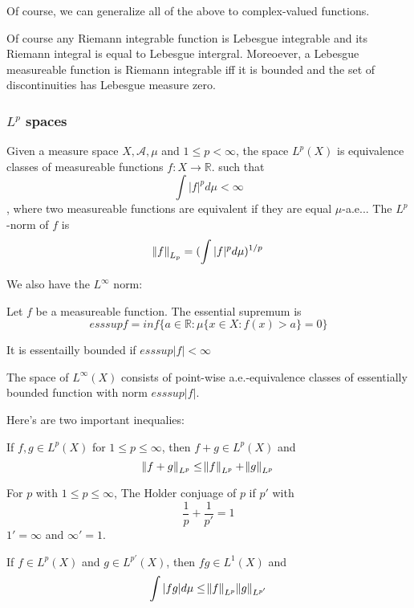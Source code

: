 \documentclass[main.tex]{subfiles}
\begin{document}
Of course, we can generalize all of the above to complex-valued functions.

\begin{theorem}
Of course any Riemann integrable function is Lebesgue integrable and its Riemann integral is equal to Lebesgue intergral. Moreoever, a Lebesgue measureable function is Riemann integrable iff it is bounded and the set of discontinuities has Lebesgue measure zero.
\end{theorem}

\subsubsection{$L^p$ spaces}

\begin{definition}
Given a measure space $X, \mathcal{A}, \mu$ and $1 \leq p < \infty$, the space $L^p(X)$ is equivalence classes of measureable functions $f: X \rightarrow \mathbb{R}$. such that
$$
\int |f|^p d\mu < \infty
$$, 
where two measureable functions are equivalent if they are equal $\mu$-a.e... The $L^p$-norm of $f$ is 
$$
\norm{f}_{L_p} = (\int |f|^p d\mu )^{1/p}
$$

\end{definition}
We also have the $L^\infty$ norm:
\begin{definition}
Let $f$ be a measureable function. The essential supremum is 
$$
ess sup f = inf \{a \in \mathbb{R}: \mu \{x \in X : f(x) > a \} = 0 \}
$$

It is essentailly bounded if $ess sup|f| < \infty$

The space of $L^\infty(X)$ consists of point-wise a.e.-equivalence classes of essentially bounded function with norm $ess sup|f|$.
\end{definition}

Here's are two important inequalies:

\begin{theorem}
If $f, g \in L^p(X)$ for $1 \leq p \leq \infty$, then $f + g \in L^p(X)$ and 
$$
\norm{f + g}_{L^p} \leq \norm{f}_{L^p} + \norm{g}_{L^p}
$$
\end{theorem}

\begin{definition}
For $p$ with $1 \leq p \leq \infty$, 
The Holder conjuage of $p$ if $p'$ with 
$$
\frac{1}{p} + \frac{1}{p'} = 1
$$
$1' = \infty$ and $\infty' = 1$.
\end{definition}

\begin{theorem}
If $f \in L^p(X)$ and $g \in L^{p'}(X)$, then $fg \in L^1(X)$ and 
$$
\int |fg| d\mu \leq \norm{f}_{L^p}\norm{g}_{L^{p'}}
$$
\end{theorem}
\end{document}
